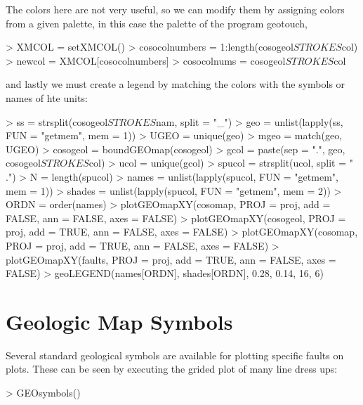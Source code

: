 \documentclass{article}
\begin{document}
\begin{Schunk}
\end{Schunk}
The colors here are not very useful, so we can modify them by
assigning colors from a given palette, in this case
the palette of the program geotouch,
\begin{Schunk}
\begin{Sinput}
> XMCOL = setXMCOL()
> cosocolnumbers = 1:length(cosogeol$STROKES$col)
> newcol = XMCOL[cosocolnumbers]
> cosocolnums = cosogeol$STROKES$col
\end{Sinput}
\end{Schunk}
and lastly we must create a legend by matching the colors with the
symbols or names of hte units:
\begin{Schunk}
\begin{Sinput}
> ss = strsplit(cosogeol$STROKES$nam, split = "_")
> geo = unlist(lapply(ss, FUN = "getmem", mem = 1))
> UGEO = unique(geo)
> mgeo = match(geo, UGEO)
> cosogeol = boundGEOmap(cosogeol)
> gcol = paste(sep = ".", geo, cosogeol$STROKES$col)
> ucol = unique(gcol)
> spucol = strsplit(ucol, split = "\\.")
> N = length(spucol)
> names = unlist(lapply(spucol, FUN = "getmem", mem = 1))
> shades = unlist(lapply(spucol, FUN = "getmem", mem = 2))
> ORDN = order(names)
> plotGEOmapXY(cosomap, PROJ = proj, add = FALSE, ann = FALSE, 
     axes = FALSE)
> plotGEOmapXY(cosogeol, PROJ = proj, add = TRUE, ann = FALSE, 
     axes = FALSE)
> plotGEOmapXY(cosomap, PROJ = proj, add = TRUE, ann = FALSE, axes = FALSE)
> plotGEOmapXY(faults, PROJ = proj, add = TRUE, ann = FALSE, axes = FALSE)
> geoLEGEND(names[ORDN], shades[ORDN], 0.28, 0.14, 16, 6)
\end{Sinput}
\end{Schunk}


\section{Geologic Map Symbols}

Several standard geological symbols are available for plotting
specific  faults on plots.
These can be seen by executing the 
grided plot of many line dress ups:
\begin{Schunk}
\begin{Sinput}
> GEOsymbols()
\end{Sinput}
\end{Schunk}
\end{document}
